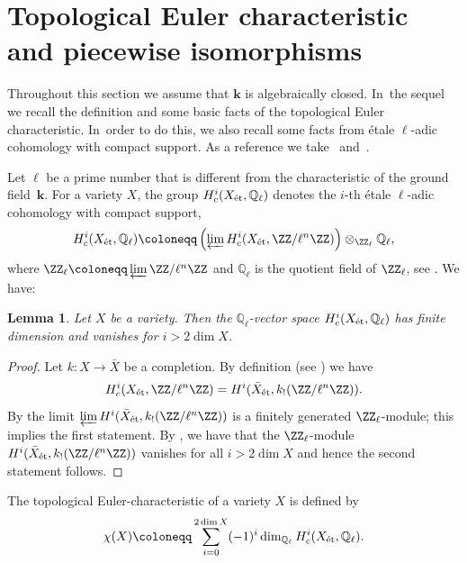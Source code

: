 \documentclass[JEP,XML,SOM,Unicode,NoFloatCountersInSection,published]{cedram}
\newtheorem{lemma}{Lemma}[section]
\theoremstyle{definition}
\newcommand\QQ{{\mathbb Q}}
\newcommand{\kk}{\mathbf{k}}
\newcommand{\et}{\textup{ét}}
\begin{document}
\section{Topological Euler characteristic and piecewise isomorphisms}
\label{sec.topEuler_characterstic_Grothendiecl_ring}
Throughout this section we assume that $\kk$ is algebraically closed. In~the sequel we recall the definition and some basic facts of the topological Euler characteristic.
In~order to do this, we also recall some facts from étale $\ell$-adic cohomology with compact support.
As a reference we take~\cite{Mi2013Lectures-on-Etale-} and~\cite{Mi1980Etale-cohomology}.

Let $\ell$ be a prime number that is different from the characteristic of the ground field~$\kk$.
For a variety $X$, the group $H^i_c(X_{\et}, \QQ_\ell)$
denotes the $i$-th étale $\ell$-adic cohomology with compact support,
\ie
\[
H^i_c(X_{\et}, \QQ_\ell) \coloneqq \left( \varprojlim H^i_c(X_{\et}, \ZZ / \ell^n \ZZ) \right) \otimes_{\ZZ_\ell} \QQ_{\ell},
\]
where $\ZZ_\ell \coloneqq \varprojlim \ZZ/ \ell^n \ZZ$ and $\QQ_\ell$ is the quotient field of $\ZZ_{\ell}$,
see \eg \cite[\S18, \S19]{Mi2013Lectures-on-Etale-}. We have:

\begin{lemma}
\label{Lem.Finitness_cohomology}
Let $X$ be a variety. Then the $\QQ_{\ell}$-vector space
$H^i_c(X_{\et}, \QQ_{\ell})$ has finite dimension and vanishes for $i > 2 \dim X$.
\end{lemma}

\begin{proof}
Let $k \colon X \to \bar{X}$ be a completion. By definition
(see \eg \cite[Def.\,18.1]{Mi2013Lectures-on-Etale-}) we have
\[
H^i_c(X_{\et}, \ZZ / \ell^n \ZZ) = H^i(\bar{X}_{\et}, k_{!}(\ZZ / \ell^n \ZZ)).
\]
By \cite[Th.\,19.2]{Mi2013Lectures-on-Etale-} the limit $\varprojlim H^i(\bar{X}_{\et}, k_{!}(\ZZ / \ell^n \ZZ))$
is a finitely generated $\ZZ_{\ell}$\nobreakdash-mod\-ule; this implies the first statement.
By \cite[Th.\,15.1]{Mi2013Lectures-on-Etale-}, we have that the $\ZZ_{\ell}$\nobreakdash-mod\-ule $H^i(\bar{X}_{\et}, k_{!}(\ZZ / \ell^n \ZZ))$
vanishes for all $i > 2 \dim X$ and hence the second statement follows.
\end{proof}

The topological Euler-characteristic of a variety $X$ is defined by
\[
\chi(X) \coloneqq \sum_{i=0}^{2 \dim X} (-1)^i \dim_{\QQ_\ell} H^i_c(X_{\et}, \QQ_\ell).
\]
\end{document}
